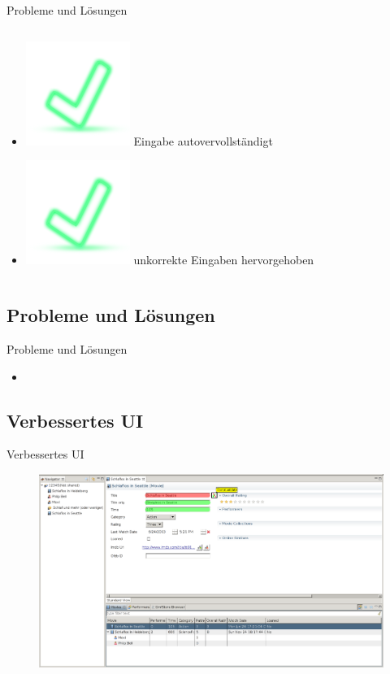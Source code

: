 \documentclass{beamer} %
\begin{document}
\begin{frame}{Probleme und Lösungen}
\begin{columns}[c]
\begin{column}{0.5\textwidth}
\begin{itemize}
					\pause
				\item \includegraphics[height=\baselineskip]{material/dialog-ok.png} Eingabe autovervollständigt
					\pause
				\item \includegraphics[height=\baselineskip]{material/dialog-ok.png} unkorrekte Eingaben hervorgehoben
			\end{itemize}
		\end{column}
	\end{columns}
\end{frame}

\subsection{Probleme und Lösungen}
\begin{frame}{Probleme und Lösungen}
			\begin{itemize}
				\item
			\end{itemize}
\end{frame}

\subsection{Verbessertes UI}
\begin{frame}{Verbessertes UI}
	\begin{figure}[H] %
		\centering
		\includegraphics[width=\linewidth]{moviemanager_all_annotaded}
	\end{figure}
\end{frame}
\end{document}
